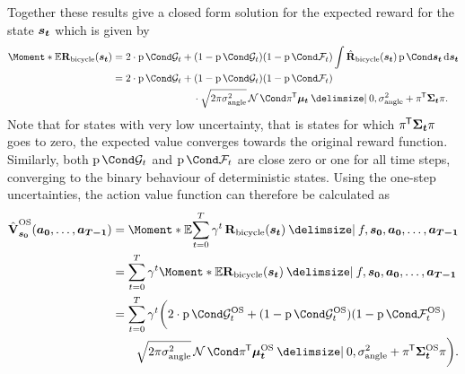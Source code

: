 Together these results give a closed form solution for the expected reward for the state $\bm{s_t}$ which is given by
\begin{align}
    \Moment*{\E}{\RwdBicycle(\rv{s_t})} &= 2 \cdot \Prob{\PGoal_t} + (1 - \Prob{\PGoal_t})(1 - \Prob{\PFallen_t}) \int \RwdBicycleHat(\rv{s_t}) \Prob{\rv{s_t}} \diff \rv{s_t} \\
    &= 2 \cdot \Prob{\PGoal_t} + (1 - \Prob{\PGoal_t})(1 - \Prob{\PFallen_t}) \\
    &\qquad\qquad\qquad\qquad\cdot\sqrt{2\pi\sigma_{\text{angle}}^2} \Gaussian{\pi\tran \mat{\mu_t} \given 0, \sigma_{\text{angle}}^2 + \pi\tran \mat{\Sigma_t}\pi}.
\end{align}
Note that for states with very low uncertainty, that is states for which $\pi\tran \mat{\Sigma_t} \pi$ goes to zero, the expected value converges towards the original reward function.
Similarly, both $\Prob{\PGoal_t}$ and $\Prob{\PFallen_t}$ are close zero or one for all time steps, converging to the binary behaviour of deterministic states.
Using the one-step uncertainties, the action value function can therefore be calculated as
\begin{align}
    \label{eq:os_action_value_function}
    \begin{split}
        \os{\AVlu}_{\mat{s_0}}(\mat{a_0}, \dots, \mat{a_{T-1}}) &= \Moment*{\E}{\sum_{t=0}^T \gamma^t \RwdBicycle(\mat{s_t}) \given f, \mat{s_0}, \mat{a_0}, \dots, \mat{a_{T-1}}} \\
        &= \sum_{t=0}^T \gamma^t \Moment*{\E}{\RwdBicycle(\mat{s_t}) \given f, \mat{s_0}, \mat{a_0}, \dots, \mat{a_{T-1}}} \\
        &= \sum_{t=0}^T \gamma^t \bigg( 2 \cdot \Prob{\os{\PGoal}_t} + (1 - \Prob{\os{\PGoal}_t})(1 - \Prob{\os{\PFallen}_t}) \\
        &\qquad \sqrt{2\pi\sigma_{\text{angle}}^2} \Gaussian{\pi\tran \os{\mat{\mu_t}} \given 0, \sigma_{\text{angle}}^2 + \pi\tran \os{\mat{\Sigma_t}}\pi} \bigg).
    \end{split}
\end{align}

